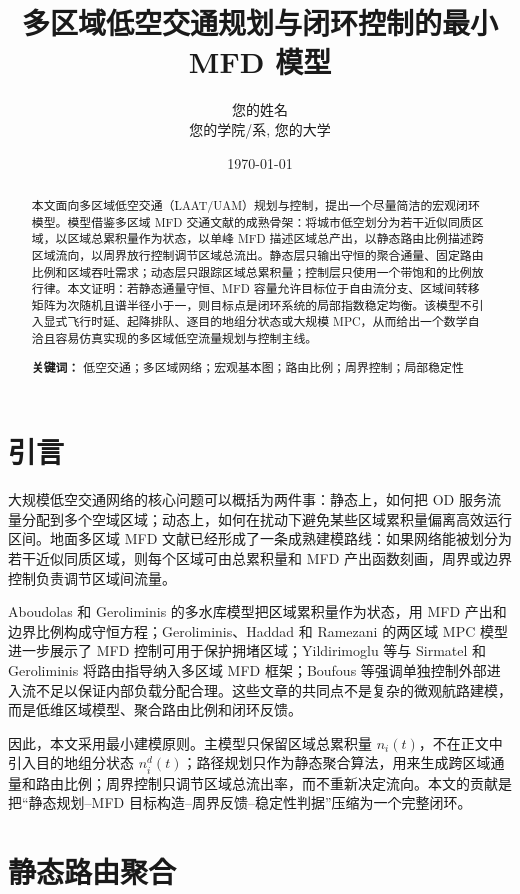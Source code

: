 \documentclass[a4paper,12pt]{article}
\title{\textbf{多区域低空交通规划与闭环控制的最小 MFD 模型}}
\author{您的姓名 \\ 您的学院/系, 您的大学}
\date{\today}
\theoremstyle{plain}
\theoremstyle{definition}
\theoremstyle{remark}
\begin{document}
\maketitle

\begin{abstract}
本文面向多区域低空交通（LAAT/UAM）规划与控制，提出一个尽量简洁的宏观闭环模型。模型借鉴多区域 MFD 交通文献的成熟骨架：将城市低空划分为若干近似同质区域，以区域总累积量作为状态，以单峰 MFD 描述区域总产出，以静态路由比例描述跨区域流向，以周界放行控制调节区域总流出。静态层只输出守恒的聚合通量、固定路由比例和区域吞吐需求；动态层只跟踪区域总累积量；控制层只使用一个带饱和的比例放行律。本文证明：若静态通量守恒、MFD 容量允许目标位于自由流分支、区域间转移矩阵为次随机且谱半径小于一，则目标点是闭环系统的局部指数稳定均衡。该模型不引入显式飞行时延、起降排队、逐目的地组分状态或大规模 MPC，从而给出一个数学自洽且容易仿真实现的多区域低空流量规划与控制主线。

\textbf{关键词：} 低空交通；多区域网络；宏观基本图；路由比例；周界控制；局部稳定性
\end{abstract}

\section{引言}

大规模低空交通网络的核心问题可以概括为两件事：静态上，如何把 OD 服务流量分配到多个空域区域；动态上，如何在扰动下避免某些区域累积量偏离高效运行区间。地面多区域 MFD 文献已经形成了一条成熟建模路线：如果网络能被划分为若干近似同质区域，则每个区域可由总累积量和 MFD 产出函数刻画，周界或边界控制负责调节区域间流量。

Aboudolas 和 Geroliminis 的多水库模型把区域累积量作为状态，用 MFD 产出和边界比例构成守恒方程；Geroliminis、Haddad 和 Ramezani 的两区域 MPC 模型进一步展示了 MFD 控制可用于保护拥堵区域；Yildirimoglu 等与 Sirmatel 和 Geroliminis 将路由指导纳入多区域 MFD 框架；Boufous 等强调单独控制外部进入流不足以保证内部负载分配合理。这些文章的共同点不是复杂的微观航路建模，而是低维区域模型、聚合路由比例和闭环反馈。

因此，本文采用最小建模原则。主模型只保留区域总累积量 $n_i(t)$，不在正文中引入目的地组分状态 $n_i^d(t)$；路径规划只作为静态聚合算法，用来生成跨区域通量和路由比例；周界控制只调节区域总流出率，而不重新决定流向。本文的贡献是把“静态规划--MFD 目标构造--周界反馈--稳定性判据”压缩为一个完整闭环。

\section{静态路由聚合}
\end{document}
